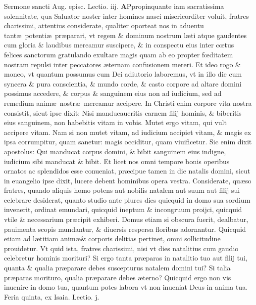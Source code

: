 \documentclass[a5paper,10pt]{book}
\def\ae{æ}
\def\oe{œ}
\begin{document}
\begin{multicols*}{2}
\newline \color{red} Sermone sancti Aug. episc. Lectio. iij. \color{black}
\vspace{-1.5em}
\lettrine[lines=2]{\bfseries \color{red} A}{}Ppropinquante iam sacratissima solennitate, qua Saluator noster inter homines nasci misericorditer voluit, fratres charissimi, attentius considerate, qualiter oporteat nos in aduentu tant\ae \ potenti\ae \ pr\ae parari, vt regem \& dominum nostrum l\ae ti atque gaudentes cum gloria \& laudibus mereamur suscipere, \& in conspectu eius inter c\oe tus felices sanctorum gratulando exultare magis quam ab eo propter f\oe ditatem nostram repulsi inter peccatores \ae ternam confusionem mereri.
Et ideo rogo \& moneo, vt quantum possumus cum Dei adiutorio laboremus, vt in illo die cum syncera \& pura conscientia, \& mundo corde, \& casto corpore ad altare domini possimus accedere, \& corpus \& sanguinem eius non ad iudicium, sed ad remedium anim\ae \ nostr\ae \ mereamur accipere.
In Christi enim corpore vita nostra consistit, sicut ipse dixit: Nisi manducaueritis carnem filij hominis, \& biberitis eius sanguinem, non habebitis vitam in vobis.
Mutet ergo vitam, qui vult accipere vitam.
Nam si non mutet vitam, ad iudicium accipiet vitam, \& magis ex ipsa corrumpitur, quam sanetur: magis occiditur, quam viuificetur.
Sic enim dixit apostolus: Qui manducat corpus domini, \& bibit sanguinem eius indigne, iudicium sibi manducat \& bibit.
Et licet nos omni tempore bonis operibus ornatos ac splendidos esse conueniat, pr\ae cipue tamen in die natalis domini, sicut in euangelio ipse dixit, lucere debent hominibus opera vestra.
Considerate, qu\ae so fratres, quando aliquis homo potens aut nobilis natalem aut suum aut filij sui celebrare desiderat, quanto studio ante plures dies quicquid in domo sua sordium invenerit, ordinat emundari, quicquid ineptum \& incongruum proijci, quicquid vtile \& necessarium pr\ae cipit exhiberi.
Domus etiam si obscura fuerit, dealbatur, pauimenta scopis mundantur, \& diuersis respersa floribus adornantur.
Quicquid etiam ad l\ae titiam anim\ae \& corporis delitias pertinet, omni sollicitudine prouidetur.
Vt quid ista, fratres charissimi, nisi vt dies natalitius cum gaudio celebretur hominis morituri?
Si ergo tanta pr\ae paras in natalitio tuo aut filij tui, quanta \& qualia pr\ae parare debes suscepturus natalem domini tui?
Si talia pr\ae paras morituro, qualia pr\ae parare debes \ae terno?
Quicquid ergo non vis inuenire in domo tua, quantum potes labora vt non inueniat Deus in anima tua.
\newline {} \color{red} \hypertarget{THU-PRIMA-ADV}{Feria quinta,} ex Isaia. \hfill Lectio. j. \color{black}

\end{multicols*}
\end{document}
